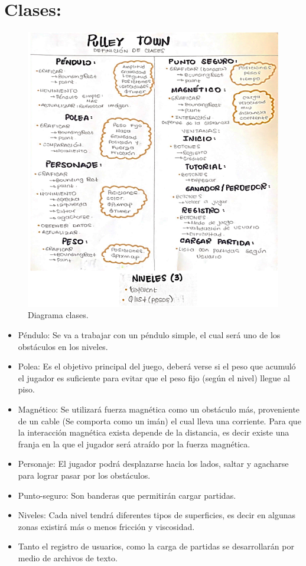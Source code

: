 \documentclass{report}   %
\begin{document}
\section{Clases:}
\begin{figure}[H]
      \centering
      \captionsetup{justification=centering}
      \includegraphics[scale=1]{diagrama1.PNG}
      \caption{Diagrama clases.}
      \label{fig:Diagrama}
   \end{figure}
\begin{itemize}
\item Péndulo: Se va a trabajar con un péndulo simple, el cual será uno de los obstáculos en los niveles.
\item Polea: Es el objetivo principal del juego, deberá verse si el peso que acumuló el jugador es suficiente para evitar que el peso fijo (según el nivel) llegue al piso.
\item Magnético: Se utilizará fuerza magnética como un obstáculo más, proveniente de un cable (Se comporta como un imán) el cual lleva una corriente. Para que la interacción magnética exista depende de la distancia, es decir existe una franja en la que el jugador será atraído por la fuerza magnética.
\item Personaje: El jugador podrá desplazarse hacia los lados, saltar y agacharse para lograr pasar por los obstáculos.
\item Punto-seguro: Son banderas que permitirán cargar partidas.
\item Niveles: Cada nivel tendrá diferentes tipos de superficies, es decir en algunas zonas existirá más o menos fricción y viscosidad.
\item Tanto el registro de usuarios, como la carga de partidas se desarrollarán por medio de archivos de texto.
\end{itemize}
\end{document}
